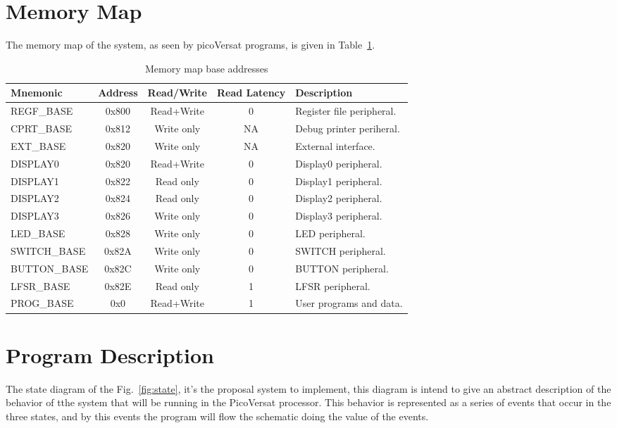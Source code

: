 \section{Memory Map}
\label{sec:mem_map}

The memory map of the system, as seen by picoVersat programs, is given in
Table~\ref{tab:memmap}.

\begin{table}[!htbp]
  \centering
    \begin{tabular}{|p{3cm}|c|c|c|p{4cm}|}
    \hline 
    {\bf Mnemonic} & {\bf Address} & {\bf Read/Write} & {\bf Read Latency} & {\bf Description} \\
    \hline \hline 
     REGF\_BASE & 0x800 & Read+Write & 0 & Register file peripheral. \\
    \hline
     CPRT\_BASE & 0x812 & Write only & NA & Debug printer periheral. \\
    \hline
     EXT\_BASE & 0x820 & Write only & NA & External interface. \\
    \hline
     DISPLAY0 & 0x820 & Read+Write & 0 & Display0 peripheral. \\ 
    \hline
     DISPLAY1 & 0x822 & Read only & 0 & Display1 peripheral. \\
    \hline
     DISPLAY2 & 0x824 & Read only & 0 & Display2 peripheral. \\
    \hline
     DISPLAY3 & 0x826 & Write only & 0 & Display3 peripheral. \\
    \hline
     LED\_BASE & 0x828 & Write only & 0 & LED peripheral. \\
    \hline
     SWITCH\_BASE & 0x82A & Write only & 0 & SWITCH peripheral. \\
    \hline
     BUTTON\_BASE & 0x82C & Write only & 0 & BUTTON peripheral. \\
    \hline
     LFSR\_BASE & 0x82E & Read only & 1 & LFSR peripheral. \\
    \hline
     PROG\_BASE & 0x0 & Read+Write & 1 & User programs and data. \\
    \hline
    \end{tabular}
  \caption{Memory map base addresses}
  \label{tab:memmap}
\end{table}

\clearpage
\section{Program Description}
\label{sec:pgrm}
The state diagram of the Fig.~\ref{fig:state}, it's the proposal system to implement, 
this diagram is intend to give an abstract description of the behavior of tthe system that 
will be running in the PicoVersat processor. This behavior is represented as a series of events 
that occur in the three states, and by this events the program will flow the schematic doing the 
value of the events.

